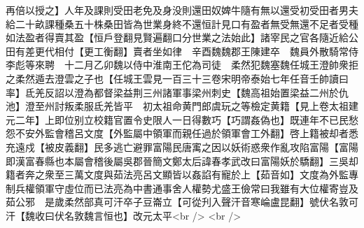 再倍以授之】人年及課則受田老免及身没則還田奴婢牛隨有無以還受初受田者男夫給二十畝課種桑五十株桑田皆為世業身終不還恒計見口有盈者無受無還不足者受種如法盈者得賣其盈【恒戶登翻見賢遍翻口分世業之法始此】諸宰民之官各隨近給公田有差更代相付【更工衡翻】賣者坐如律　辛酉魏魏郡王陳建卒　魏員外散騎常侍李彪等來聘　十二月乙卯魏以侍中淮南王佗為司徒　柔然犯魏塞魏任城王澄帥衆拒之柔然遁去澄雲之子也【任城王雲見一百三十三卷宋明帝泰始七年任音壬帥讀曰率】氐羌反詔以澄為都督梁益荆三州諸軍事梁州刺史【魏高祖始置梁益二州於仇池】澄至州討叛柔服氐羌皆平　初太祖命黄門郎虞玩之等檢定黄籍【見上卷太祖建元二年】上即位别立校籍官置令史限人一日得數巧【巧謂姦偽也】既連年不已民愁怨不安外監會稽呂文度【外監屬中領軍而親任過於領軍會工外翻】啓上籍被却者悉充遠戍【被皮義翻】民多逃亡避罪富陽民唐㝢之因以妖術惑衆作亂攻陷富陽【富陽即漢富春縣也本屬會稽後屬吳郡晉簡文鄭太后諱春孝武改曰富陽妖於驕翻】三吳却籍者奔之衆至三萬文度與茹法亮呂文顯皆以姦諂有寵於上【茹音如】文度為外監專制兵權領軍守虛位而已法亮為中書通事舍人權勢尤盛王儉常曰我雖有大位權寄豈及茹公邪　是歲柔然部真可汗卒子豆崙立【可從刋入聲汗音寒崘盧昆翻】號伏名敦可汗【魏收曰伏名敦魏言恒也】改元太平<br />
<br />
